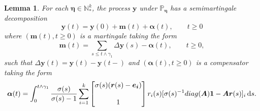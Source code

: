 \documentclass[12pt, leqno]{article}
\newtheorem{lemma}{Lemma}
\newcommand{\dd}{{\mathrm d}}
\begin{document}
\begin{lemma}\label{2} For each $\bm\eta\in\mathbb{N}^k_*$, 
the process $\bm y$ under $\mathbb{P}_{\bm\eta}$ has a semimartingale decomposition 
\begin{equation}
\bm y(t) = \bm y(0)+ \bm m(t) + \bm \alpha(t), \qquad t\geq0
\label{ysemimg}
\end{equation}
 where $(\bm m(t), t\geq0)$  is a martingale taking the form
\begin{equation}
\bm m(t) = \sum_{s\leq t\wedge \gamma_1}\Delta \bm y(s) - \bm\alpha(t), \qquad t\geq0,
\label{mgdef}
\end{equation} 
such that 
$
\Delta\bm y(t) =\bm y(t)- \bm y(t-) 
$
and $(\bm \alpha(t), t\geq0)$ is a compensator taking  the form 
\begin{equation}
\bm\alpha(t) =\int_{0}^{t\wedge \gamma_1 } \frac{\sigma(s)}{\sigma(s)-1}\sum_{i = 1}^k \begin{bmatrix} \sigma(s)({\bm r} (s)-\bm{e_i}) \\ \\ 1\end{bmatrix}r_i(s) [\sigma(s)^{-1} {\rm diag}(\bm A)\bm{1}-\bm A\bm r(s) ]_i \,\dd s.
\label{da}
\end{equation}
\end{lemma}
\end{document}
